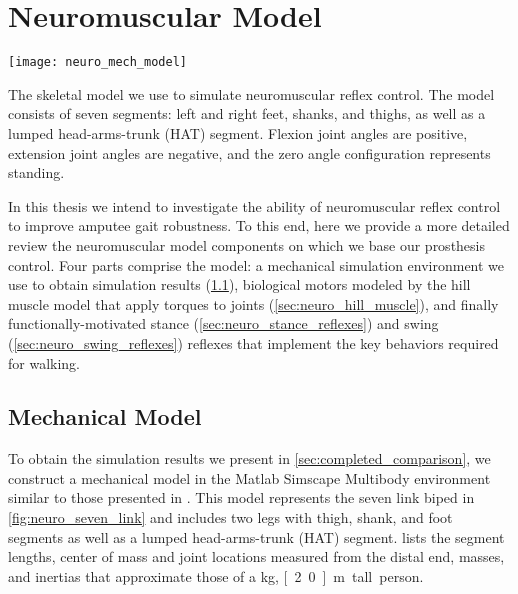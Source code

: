 \chapter{Neuromuscular Model}\label{sec:neuro_model}
\begin{marginfigure}
    \centering
    \texttt{[image: neuro\_mech\_model]}
    \caption{The skeletal model we use to simulate neuromuscular reflex control.
    The model consists of seven segments: left and right feet, shanks, and
    thighs, as well as a lumped head-arms-trunk (HAT) segment. Flexion joint
    angles are positive, extension joint angles are negative, and the zero
    angle configuration represents standing.}
    \label{fig:neuro_seven_link}
\end{marginfigure}

In this thesis we intend to investigate the ability of neuromuscular reflex
control to improve amputee gait robustness. To this end, here we provide a more
detailed review the neuromuscular model components on which we base our
prosthesis control. Four parts comprise the model: a mechanical simulation
environment we use to obtain simulation results (\cref{sec:neuro_mech_model}),
biological motors modeled by the hill muscle model that apply torques to joints
(\cref{sec:neuro_hill_muscle}), and finally functionally-motivated stance
(\cref{sec:neuro_stance_reflexes}) and swing (\cref{sec:neuro_swing_reflexes})
reflexes that implement the key behaviors required for walking.

\section{Mechanical Model}\label{sec:neuro_mech_model}

To obtain the simulation results we present in \cref{sec:completed_comparison},
we construct a mechanical model in the Matlab Simscape Multibody environment
similar to those presented in \citet{geyer2010muscle, song2013integration,
song2015neural}.  This model represents the seven link biped in
\cref{fig:neuro_seven_link} and includes two legs with thigh, shank, and foot
segments as well as a lumped head-arms-trunk (HAT) segment.
 lists the segment lengths, center of mass and joint
locations measured from the distal end, masses, and inertias that approximate
those of a \unit[80]{kg}, \unit[2.0]{m} tall person.

